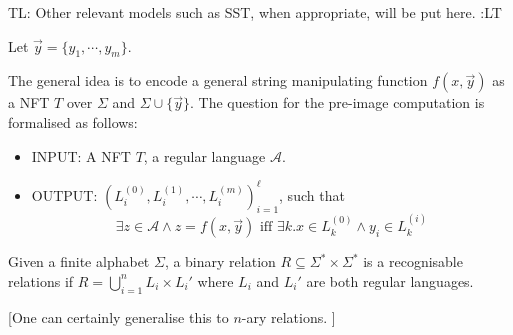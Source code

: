 \documentclass{llncs}
\newcommand{\tl}[1]{\color{blue} {TL: #1 :LT} \color{black}}
\newcommand{\tl}[1]{}
\begin{document}
\tl{Other relevant models such as SST, when appropriate, will be put here.}

Let $\vec{y}=\{y_1, \cdots, y_m\}$.

The general idea is to encode a general string manipulating function $f(x, \vec{y})$ as a NFT $T$ over $\Sigma$ and $\Sigma\cup\{\vec{y}\}$. The question for the pre-image computation is formalised as follows:
\begin{itemize}
\item INPUT: A NFT $T$, a regular language $\mathcal{A}$. 
\item OUTPUT: $(L^{(0)}_i, L^{(1)}_i, \cdots, L^{(m)}_i )_{i=1}^\ell$, such that 
\[\exists z\in\mathcal{A} \wedge z=f(x, \vec{y})\mbox{ iff }\exists k. x\in L^{(0)}_k \wedge y_i\in L^{(i)}_k \]
\end{itemize}


\begin{definition}
	Given a finite alphabet $\Sigma$, a binary relation $R\subseteq \Sigma^*\times \Sigma^*$ is a recognisable relations if $R=\bigcup_{i=1}^n L_i\times L_i'$ where $L_i$ and $L_i'$ are both regular languages. 

[One can certainly generalise this to $n$-ary relations. ]
\end{definition}
\end{document}
